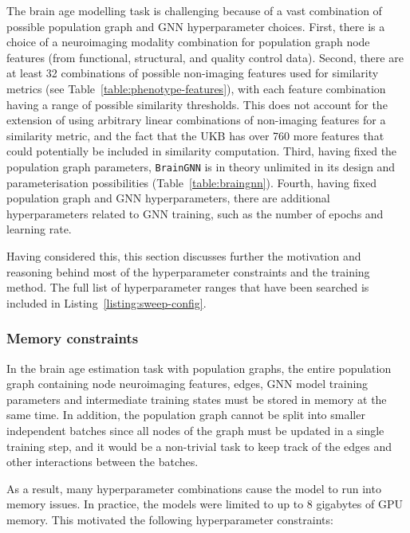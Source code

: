 The brain age modelling task is challenging because of a vast combination of possible population graph and GNN hyperparameter choices. First, there is a choice of a neuroimaging modality combination for population graph node features (from functional, structural, and quality control data). Second, there are at least 32 combinations of possible non-imaging features used for similarity metrics (see Table~\ref{table:phenotype-features}), with each feature combination having a range of possible similarity thresholds. This does not account for the extension of using arbitrary linear combinations of non-imaging features for a similarity metric, and the fact that the UKB has over 760 more features that could potentially be included in similarity computation. Third, having fixed the population graph parameters, \texttt{BrainGNN} is in theory unlimited in its design and parameterisation possibilities (Table~\ref{table:braingnn}). Fourth, having fixed population graph and GNN hyperparameters, there are additional hyperparameters related to GNN training, such as the number of epochs and learning rate.

Having considered this, this section discusses further the motivation and reasoning behind most of the hyperparameter constraints and the training method. The full list of hyperparameter ranges that have been searched is included in Listing~\ref{listing:sweep-config}. 

\subsubsection{Memory constraints}
\label{section:memory}

In the brain age estimation task with population graphs, the entire population graph containing node neuroimaging features, edges, GNN model training parameters and intermediate training states must be stored in memory at the same time. In addition, the population graph cannot be split into smaller independent batches since all nodes of the graph must be updated in a single training step, and it would be a non-trivial task to keep track of the edges and other interactions between the batches.

As a result, many hyperparameter combinations cause the model to run into memory issues. In practice, the models were limited to up to 8 gigabytes of GPU memory. This motivated the following hyperparameter constraints:


